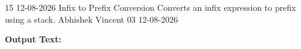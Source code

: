 \clearpage
\label{prog:15}
\programhead
  {15}
  {12-08-2026}
  {Infix to Prefix Conversion}
  {Converts an infix expression to prefix using a stack.}
  {Abhishek Vincent}
  {03}
  {12-08-2026}

\divider
\textbf{Output Text:}\par
\vspace{2pt}

